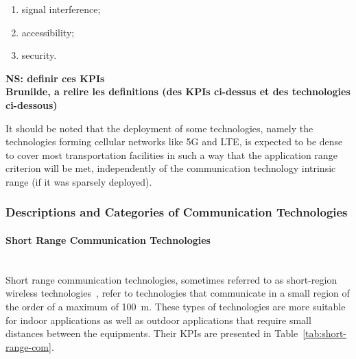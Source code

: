 \begin{enumerate}
\item signal interference;
\item accessibility;
\item security.
\end{enumerate}

{\bf NS: definir ces KPIs\\
Brunilde, a relire les definitions (des KPIs ci-dessus et des technologies ci-dessous)}

It should be noted that the deployment of some technologies, namely the technologies forming cellular networks like 5G and LTE, is expected to be dense to cover most transportation facilities in such a way that the application range criterion will be met, independently of the communication technology intrinsic range (if it was sparsely deployed). 




\subsubsection{Descriptions and Categories of Communication Technologies}

\paragraph{Short Range Communication Technologies}\ \\
Short range communication technologies, sometimes referred to as short-region wireless technologies~\cite{yu_technology_2018}, refer to technologies that communicate in a small region of the order of a maximum of 100~m. These types of technologies are more suitable for indoor applications as well as outdoor applications that require small distances between the equipments. Their \acrshort{KPI}s are presented in Table~\ref{tab:short-range-com}.

